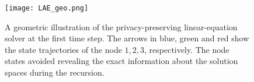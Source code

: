 \documentclass[a4paper, 11pt]{article}
\newcommand{\1}{\mathbf{1}}
\newcommand{\mE}{\mathrm{E}}
\newcommand{\mT}{\mathrm{T}}
\newcommand{\mET}{\mE_{\mT}^{^o}}
\newcommand{\gammab}{{\bm \gamma}}
\newcommand{\tbeg}{n-1 }
\newcommand{\tend}{t^\ast}
\begin{document}
\begin{figure}
	\centering
	\texttt{[image: LAE\_geo.png]}
	\caption{A geometric illustration of the privacy-preserving linear-equation solver at the first time step. The arrows in blue, green and red show the state trajectories of the node $1,2,3$, respectively. The node states avoided revealing the exact information about the solution spaces during the recursion.}
	\label{fig:lae_geo}
\end{figure}


\end{document}
